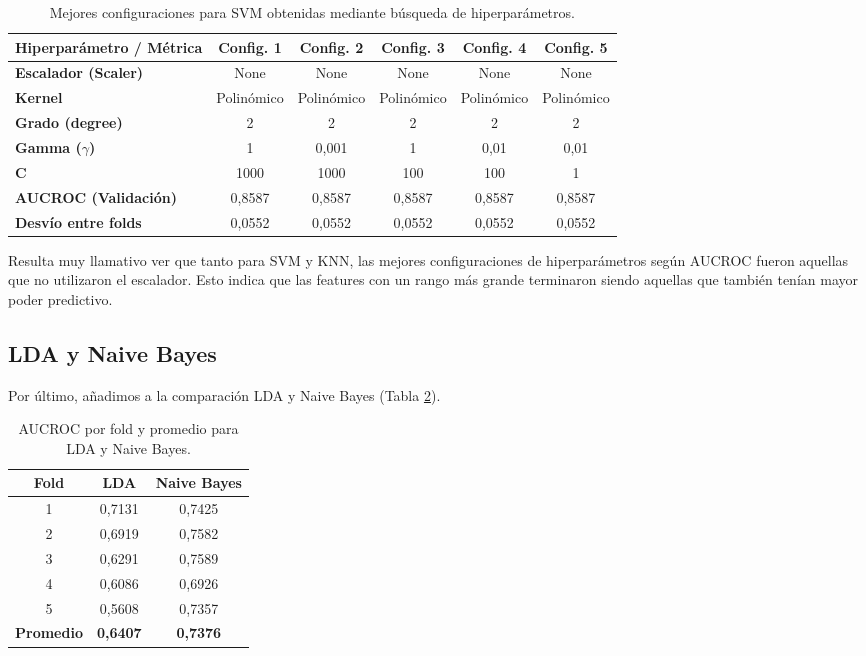 \documentclass[10pt,a4paper]{article}
\begin{document}
\begin{table}[H]
\centering
\small %
\setlength{\tabcolsep}{8pt} %
\renewcommand{\arraystretch}{1.2} %

\begin{tabular}{lccccc}
\toprule
\textbf{Hiperparámetro / Métrica} & \textbf{Config. 1} & \textbf{Config. 2} & \textbf{Config. 3} & \textbf{Config. 4} & \textbf{Config. 5} \\
\midrule
\textbf{Escalador (Scaler)} & None       & None       & None       & None       & None \\
\textbf{Kernel}             & Polinómico & Polinómico & Polinómico & Polinómico & Polinómico \\
\textbf{Grado (degree)}     & 2          & 2          & 2          & 2          & 2 \\
\textbf{Gamma ($\gamma$)}   & 1          & 0,001     & 1          & 0,01       & 0,01 \\
\textbf{C}                  & 1000       & 1000       & 100        & 100          & 1 \\
\midrule
\textbf{AUCROC (Validación)}    & 0,8587 & 0,8587 & 0,8587 & 0,8587 & 0,8587 \\
\textbf{Desvío entre folds}     & 0,0552 & 0,0552 & 0,0552 & 0,0552 & 0,0552 \\
\bottomrule
\end{tabular}

\caption{Mejores configuraciones para SVM obtenidas mediante búsqueda de hiperparámetros.}
\label{tab:svm_gridsearch}
\end{table}

Resulta muy llamativo ver que tanto para SVM y KNN, las mejores configuraciones de hiperparámetros según AUCROC fueron aquellas que no utilizaron el escalador. 
Esto indica que las features con un rango más grande terminaron siendo aquellas que también tenían mayor poder predictivo.

\subsection{LDA y Naive Bayes}
Por último, añadimos a la comparación LDA y Naive Bayes (Tabla \ref{tab:aucroc_lda_nb}).

\begin{table}[H]
\centering
\begin{tabular}{c|cc}
\toprule
\textbf{Fold} & \textbf{LDA} & \textbf{Naive Bayes} \\
\midrule
1 & 0,7131 & 0,7425 \\
2 & 0,6919 & 0,7582 \\
3 & 0,6291 & 0,7589 \\
4 & 0,6086 & 0,6926 \\
5 & 0,5608 & 0,7357 \\
\midrule
\textbf{Promedio} & \textbf{0,6407} & \textbf{0,7376} \\
\bottomrule
\end{tabular}
\caption{AUCROC por fold y promedio para LDA y Naive Bayes.}
\label{tab:aucroc_lda_nb}
\end{table}
\end{document}
